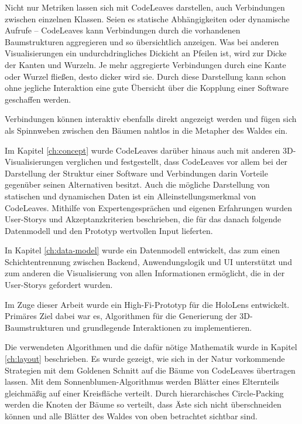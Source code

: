 Nicht nur Metriken lassen sich mit CodeLeaves darstellen, auch Verbindungen zwischen einzelnen Klassen. Seien es statische Abhängigkeiten oder dynamische Aufrufe -- CodeLeaves kann Verbindungen durch die vorhandenen Baumstrukturen aggregieren und so übersichtlich anzeigen. Was bei anderen Visualisierungen ein undurchdringliches Dickicht an Pfeilen ist, wird zur Dicke der Kanten und Wurzeln. Je mehr aggregierte Verbindungen durch eine Kante oder Wurzel fließen, desto dicker wird sie. Durch diese Darstellung kann schon ohne jegliche Interaktion eine gute Übersicht über die Kopplung einer Software geschaffen werden.

Verbindungen können interaktiv ebenfalls direkt angezeigt werden und fügen sich als Spinnweben zwischen den Bäumen nahtlos in die Metapher des Waldes ein.

Im Kapitel \ref{ch:concept} wurde CodeLeaves darüber hinaus auch mit anderen 3D-Visualisierungen verglichen und festgestellt, dass CodeLeaves vor allem bei der Darstellung der Struktur einer Software und Verbindungen darin Vorteile gegenüber seinen Alternativen besitzt. Auch die mögliche Darstellung von statischen und dynamischen Daten ist ein Alleinstellungsmerkmal von CodeLeaves. Mithilfe von Expertengesprächen und eigenen Erfahrungen wurden User-Storys und Akzeptanzkriterien beschrieben, die für das danach folgende Datenmodell und den Prototyp wertvollen Input lieferten.

In Kapitel \ref{ch:data-model} wurde ein Datenmodell entwickelt, das zum einen Schichtentrennung zwischen Backend, Anwendungslogik und UI unterstützt und zum anderen die Visualisierung von allen Informationen ermöglicht, die in der User-Storys gefordert wurden.

Im Zuge dieser Arbeit wurde ein High-Fi-Prototyp für die HoloLens entwickelt. Primäres Ziel dabei war es, Algorithmen für die Generierung der 3D-Baumstrukturen und grundlegende Interaktionen zu implementieren.

Die verwendeten Algorithmen und die dafür nötige Mathematik wurde in Kapitel \ref{ch:layout} beschrieben. Es wurde gezeigt, wie sich in der Natur vorkommende Strategien mit dem Goldenen Schnitt auf die Bäume von CodeLeaves übertragen lassen. Mit dem Sonnenblumen-Algorithmus werden Blätter eines Elternteils gleichmäßig auf einer Kreisfläche verteilt. Durch hierarchisches Circle-Packing werden die Knoten der Bäume so verteilt, dass Äste sich nicht überschneiden können und alle Blätter des Waldes von oben betrachtet sichtbar sind.

